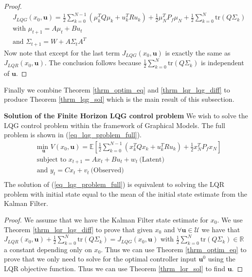 \begin{proof}
\begin{equation}
\begin{aligned}
&J_{LQG}(x_0, \mathbf{u}) = \frac{1}{2}\sum_{k=0}^{N-1} \left( \mu_k^TQ\mu_k + u_k^TRu_k \right) + \frac{1}{2}\mu_N^TP_f\mu_N + \frac{1}{2}\sum_{k=0}^N \text{tr}(Q\Sigma_k) \\
&\text{with } \mu_{t+1} = A\mu_t +Bu_t \\
&\text{and } \Sigma_{t+1} = W+A\Sigma_t A^T 
\end{aligned}
\label{eq_simpl_obj_func}
\end{equation}
Now note that except for the last term $J_{LQG}(x_0, \mathbf{u})$ is exactly the same as $J_{LQR}(x_0, \mathbf{u})$. The conclusion follows because $\frac{1}{2}\sum_{k=0}^N \text{tr}(Q\Sigma_k)$ is independent of $\mathbf{u}$. 
\end{proof}
Finally we combine Theorem \ref{thrm_optim_eq} and \ref{thrm_lqr_lqg_diff} to produce Theorem \ref{thrm_lqg_sol} which is the main result of this subsection.
\begin{thrm}
\textbf{Solution of the Finite Horizon LQG control problem} We wish to solve the LQG control problem within the framework of Graphical Models. The full problem is shown in (\ref{eq_lqg_problem_full}).
\begin{equation}
\begin{aligned}
&\underset{\mathbf{u}}{\text{min }} V(x_0, \mathbf{u}) = \mathbb{E}\left[ \frac{1}{2}\sum_{k=0}^{N-1} \left( x_k^TQx_k + u_k^TRu_k \right) + \frac{1}{2}x_N^TP_fx_N \right] \\
& \text{subject to } x_{t+1}=Ax_t+Bu_t + w_t~\text{(Latent)} \\
& \text{and } y_{t}= Cx_t + v_t~\text{(Observed)}\\
\end{aligned}
\label{eq_lqg_problem_full}
\end{equation}
The solution of (\ref{eq_lqg_problem_full}) is equivalent to solving the LQR problem with initial state equal to the mean of the initial state estimate from the Kalman Filter.
\label{thrm_lqg_sol}
\end{thrm}
\begin{proof}
We assume that we have the Kalman Filter state estimate for $x_0$. We use Theorem \ref{thrm_lqr_lqg_diff} to prove that given $x_0$ and $\forall \mathbf{u} \in \mathcal{U}$ we have that $J_{LQR}(x_0, \mathbf{u}) + \frac{1}{2}\sum_{k=0}^N \text{tr}(Q\Sigma_k) = J_{LQG}(x_0, \mathbf{u})$ with $\frac{1}{2}\sum_{k=0}^N \text{tr}(Q\Sigma_k) \in \mathbb{R}$ a constant depending only on $x_0$. Thus we can use Theorem \ref{thrm_optim_eq} to prove that we only need to solve for the optimal controller input $\mathbf{u}^0$ using the LQR objective function. Thus we can use Theorem \ref{thrm_lqr_sol} to find $\mathbf{u}$. 
\end{proof}

